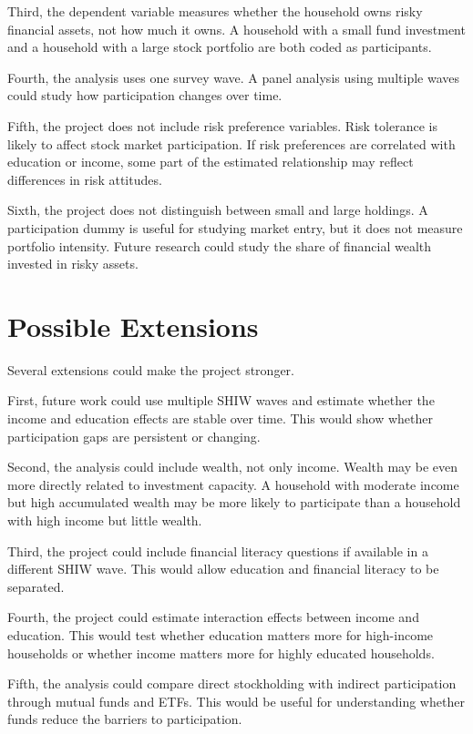 \documentclass[12pt]{article}
\begin{document}
Third, the dependent variable measures whether the household owns risky financial assets, not how much it owns. A household with a small fund investment and a household with a large stock portfolio are both coded as participants.

Fourth, the analysis uses one survey wave. A panel analysis using multiple waves could study how participation changes over time.

Fifth, the project does not include risk preference variables. Risk tolerance is likely to affect stock market participation. If risk preferences are correlated with education or income, some part of the estimated relationship may reflect differences in risk attitudes.

Sixth, the project does not distinguish between small and large holdings. A participation dummy is useful for studying market entry, but it does not measure portfolio intensity. Future research could study the share of financial wealth invested in risky assets.

\section{Possible Extensions}

Several extensions could make the project stronger.

First, future work could use multiple SHIW waves and estimate whether the income and education effects are stable over time. This would show whether participation gaps are persistent or changing.

Second, the analysis could include wealth, not only income. Wealth may be even more directly related to investment capacity. A household with moderate income but high accumulated wealth may be more likely to participate than a household with high income but little wealth.

Third, the project could include financial literacy questions if available in a different SHIW wave. This would allow education and financial literacy to be separated.

Fourth, the project could estimate interaction effects between income and education. This would test whether education matters more for high-income households or whether income matters more for highly educated households.

Fifth, the analysis could compare direct stockholding with indirect participation through mutual funds and ETFs. This would be useful for understanding whether funds reduce the barriers to participation.
\end{document}
